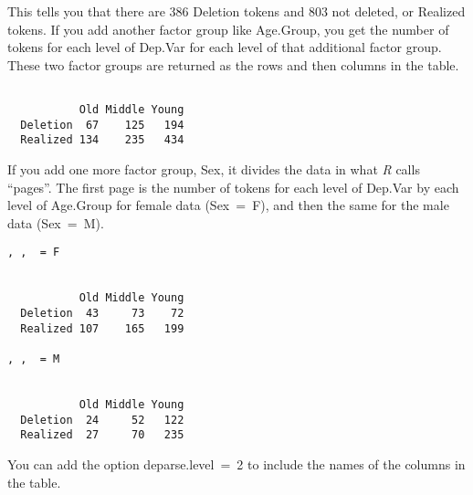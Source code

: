 \documentclass[
  12pt,
  letterpaper]{article}
\newenvironment{Shaded}{\begin{snugshade}}{\end{snugshade}}
\newcommand{\CommentTok}[1]{\textcolor[rgb]{0.37,0.37,0.37}{#1}}
\newcommand{\FunctionTok}[1]{\textcolor[rgb]{0.28,0.35,0.67}{#1}}
\newcommand{\NormalTok}[1]{\textcolor[rgb]{0.00,0.23,0.31}{#1}}
\newcommand{\SpecialCharTok}[1]{\textcolor[rgb]{0.37,0.37,0.37}{#1}}
\renewcommand\texttt[1]{{\ttfamily\color{BrickRed}#1}}
\begin{document}
This tells you that there are 386 \texttt{Deletion} tokens and 803 not
deleted, or \texttt{Realized} tokens. If you add another factor group
like \texttt{Age.Group}, you get the number of tokens for each level of
\texttt{Dep.Var} for each level of that additional factor group. These
two factor groups are returned as the rows and then columns in the
table.

\begin{Shaded}
\end{Shaded}

\begin{verbatim}
          
           Old Middle Young
  Deletion  67    125   194
  Realized 134    235   434
\end{verbatim}

If you add one more factor group, \texttt{Sex}, it divides the data in
what \emph{R} calls ``pages''. The first page is the number of tokens
for each level of \texttt{Dep.Var} by each level of \texttt{Age.Group}
for female data (\texttt{Sex\ =\ F}), and then the same for the male
data (\texttt{Sex\ =\ M}).

\begin{Shaded}
\end{Shaded}

\begin{verbatim}
, ,  = F

          
           Old Middle Young
  Deletion  43     73    72
  Realized 107    165   199

, ,  = M

          
           Old Middle Young
  Deletion  24     52   122
  Realized  27     70   235
\end{verbatim}

You can add the option \texttt{deparse.level\ =\ 2} to include the names
of the columns in the table.
\end{document}
